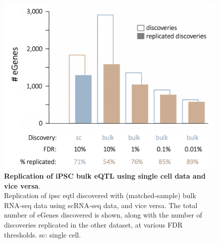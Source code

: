 \begin{figure}[h]
\centering
\includegraphics[width=12cm]{Chapter3/Fig/sc_vs_bulk_eqtl.png}
\caption[iPSC eQTL (bulk vs sc)]{\textbf{Replication of iPSC bulk eQTL using single cell data and vice versa}.\\
Replication of \gls{ipsc} \gls{eqtl} discovered with (matched-sample) bulk RNA-seq data using scRNA-seq data, and vice versa.
The total number of eGenes discovered is shown, along with the number of discoveries replicated in the other dataset, at various FDR thresholds. 
sc: single cell.}
\label{fig:sc_bulk_egenes}
\end{figure}



